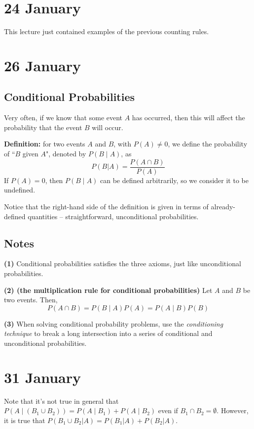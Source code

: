 \documentclass[12pt]{article}
\begin{document}
\section{24 January}
This lecture just contained examples of the previous counting rules.

\section{26 January}
\subsection{Conditional Probabilities}
Very often, if we know that some event $A$ has occurred, then this will affect the probability that the event $B$ will occur.

\textbf{Definition:} for two events $A$ and $B$, with $P(A) \neq 0$, we define the probability of ``$B$ given $A$", denoted by $P(B \; | \; A)$, as
\[
    P(B|A) = \frac{P(A \cap B)}{P(A)}
\]
If $P(A) = 0$, then $P(B \; | \; A)$ can be defined arbitrarily, so we consider it to be undefined.

Notice that the right-hand side of the definition is given in terms of already-defined quantities -- straightforward, unconditional probabilities. 

\subsection{Notes}
\textbf{(1)} Conditional probabilities satisfies the three axioms, just like unconditional probabilities.

\textbf{(2) (the multiplication rule for conditional probabilities)} Let $A$ and $B$ be two events. Then,
\[
    P(A \cap B) = P(B \; | \; A) P(A) = P(A \; | \; B) P(B)
\]

\textbf{(3)} When solving conditional probability problems, use the \emph{conditioning technique} to break a long intersection into a series of conditional and unconditional probabilities.

\section{31 January} 
Note that it's not true in general that $P(A \; | \; (B_1 \cup B_2)) = P(A \; | \; B_1) + P(A \; | \; B_2)$ even if $B_1 \cap B_2 = \emptyset$. However, it is true that $P(B_1 \cup B_2 | A) = P(B_1 | A) + P(B_2 | A)$.
\end{document}

